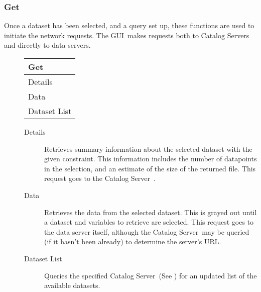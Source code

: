 \documentclass[10pt]{report}
\newcommand{\cs}{Catalog Server}
\newcommand{\gui}{GUI}
\begin{document}
\subsubsection{Get}
\label{sec:menu:get}
Once a dataset has been selected, and a query set up, these
functions are used to initiate the network requests.  The \gui\ 
makes requests both to \cs s and directly to data servers.
\begin{description}
\item[] 
  \begin{center}
    \begin{tabular}[c]{|l|} \hline
      \textbf{Get} \\ \hline
      Details \\
      Data \\ 
      Dataset List \\ \hline
    \end{tabular}
  \end{center}
  \begin{description}
  \item[Details] Retrieves summary information about the selected
    dataset with the given constraint.  This information includes the
    number of datapoints in the selection, and an estimate of the size
    of the returned file.  This request goes to the \cs\ .
  \item[Data] Retrieves the data from the selected dataset.  This is
    grayed out until a dataset and variables to retrieve are
    selected.  This request goes to the data server itself, although
    the \cs\ may be queried (if it hasn't been already) to determine
    the server's URL.
  \item[Dataset List] Queries the specified \cs\ (See
    ) for an updated list of the available datasets.
  \end{description}
\end{description}
\end{document}
